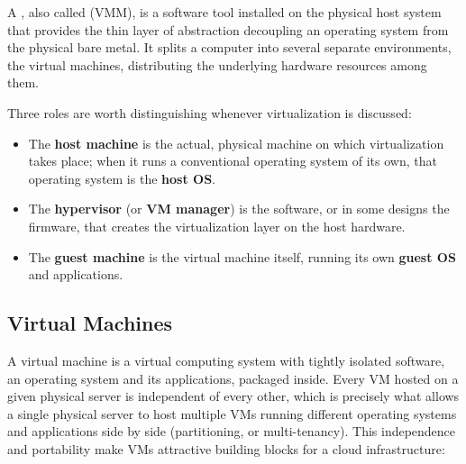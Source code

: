 \begin{definitionblock}[Hypervisor]
    A , also called  (VMM), is a software tool installed on the physical host system that provides the thin layer of abstraction decoupling an operating system from the physical bare metal. It splits a computer into several separate environments, the virtual machines, distributing the underlying hardware resources among them.
\end{definitionblock}

Three roles are worth distinguishing whenever virtualization is discussed:

\begin{itemize}
    \item The \textbf{host machine} is the actual, physical machine on which virtualization takes place; when it runs a conventional operating system of its own, that operating system is the \textbf{host OS}.
    \item The \textbf{hypervisor} (or \textbf{VM manager}) is the software, or in some designs the firmware, that creates the virtualization layer on the host hardware.
    \item The \textbf{guest machine} is the virtual machine itself, running its own \textbf{guest OS} and applications.
\end{itemize}


\subsection{Virtual Machines} \label{sec:virtual_machines}

A virtual machine is a virtual computing system with tightly isolated software, an operating system and its applications, packaged inside. Every VM hosted on a given physical server is independent of every other, which is precisely what allows a single physical server to host multiple VMs running different operating systems and applications side by side (partitioning, or multi-tenancy). This independence and portability make VMs attractive building blocks for a cloud infrastructure:

